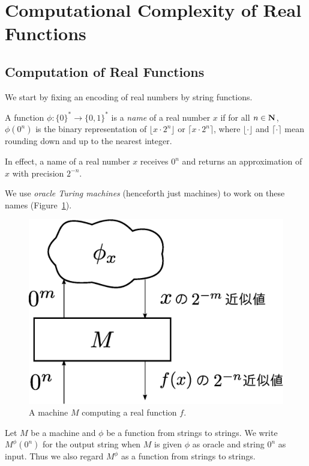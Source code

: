 \section{Computational Complexity of Real Functions}
\label{section: preliminaries}

\subsection{Computation of Real Functions}

We start by fixing an encoding of real numbers 
by string functions.
\begin{definition}
 A function $\phi \colon \{0\} ^* \to \{0, 1\}^*$ is a \emph{name} of a real number $x$ 
 if for all $n \in \mathbf N$,
  $\phi(0^n)$ is the binary representation of $\lfloor x \cdot 2^n \rfloor$ or
  $\lceil x \cdot 2^n \rceil$,
 where $\lfloor \cdot \rfloor$ and $\lceil \cdot \rceil$ mean
 rounding down and up to the nearest integer.
 \end{definition}

In effect, a name of a real number $x$ receives $0 ^n$ and 
returns an approximation of $x$ with precision $2 ^{-n}$.

We use \emph{oracle Turing machines} (henceforth just machines)
to work on these names (Figure~\ref{fig:model-of-function}).
 \begin{figure}
  \begin{center}
   \includegraphics[height=0.15\textheight]{image/model-of-function.eps}
  \end{center}
  \caption{A machine $M$ computing a real function $f$.}
  \label{fig:model-of-function}
 \end{figure}
Let $M$ be a machine and $\phi$ be a function from strings to strings. 
We write $M ^\phi (0 ^n)$ for the output string 
when $M$ is given
$\phi$ as oracle and string $0^n$ as input.
Thus we also regard $M^\phi$ as a function from strings to strings.


